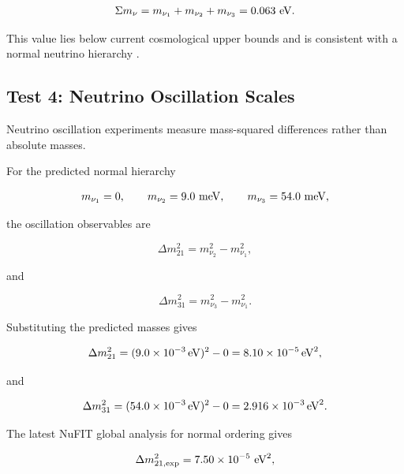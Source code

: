 \documentclass[11pt]{article}
\theoremstyle{definition}
\theoremstyle{remark}
\begin{document}
\begin{equation}
\Sigma m_\nu
=
m_{\nu_1}
+
m_{\nu_2}
+
m_{\nu_3}
=
0.063~{\rm eV}.
\end{equation}

This value lies below current cosmological upper bounds and is
consistent with a normal neutrino hierarchy
\cite{PDG2024,Planck2018}.



\subsection{Test 4: Neutrino Oscillation Scales}

Neutrino oscillation experiments measure mass-squared
differences rather than absolute masses.

For the predicted normal hierarchy

\begin{equation}
m_{\nu_1}=0,
\qquad
m_{\nu_2}=9.0~{\rm meV},
\qquad
m_{\nu_3}=54.0~{\rm meV},
\end{equation}

the oscillation observables are

\begin{equation}
\Delta m_{21}^{2}
=
m_{\nu_2}^{2}
-
m_{\nu_1}^{2},
\end{equation}

and

\begin{equation}
\Delta m_{31}^{2}
=
m_{\nu_3}^{2}
-
m_{\nu_1}^{2}.
\end{equation}

Substituting the predicted masses gives

\begin{equation}
\Delta m_{21}^{2}
=
(9.0\times10^{-3}\,{\rm eV})^{2}
-
0
=
8.10\times10^{-5}\,{\rm eV}^{2},
\end{equation}

and

\begin{equation}
\Delta m_{31}^{2}
=
(54.0\times10^{-3}\,{\rm eV})^{2}
-
0
=
2.916\times10^{-3}\,{\rm eV}^{2}.
\end{equation}

The latest NuFIT global analysis for normal ordering gives\cite{NuFIT2024,NuFITWeb}


\begin{equation}
\Delta m_{21,\rm exp}^{2}
=
7.50\times10^{-5}
~{\rm eV}^{2},
\end{equation}
\end{document}
